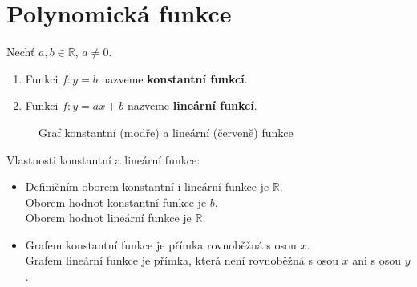 \section{Polynomická funkce}

\begin{definition}
Nechť $a, b \in \mathbb R$, $a \neq 0$.
\begin{enumerate}[$i.$]
  \item Funkci $f\colon y = b$ nazveme \textbf{konstantní funkcí}.
  \item Funkci $f\colon y= ax + b$ nazveme \textbf{lineární funkcí}.
\end{enumerate}
\end{definition}

\begin{figure}[ht!]
\begin{center}
  \caption{Graf konstantní (modře) a lineární (červeně) funkce}
\end{center}
\end{figure}

\begin{pozn}
Vlastnosti konstantní a lineární funkce:
  \begin{itemize}
    \item Definičním oborem konstantní i lineární funkce je $\mathbb R$. \\
          Oborem hodnot konstantní funkce je ${b}$.\\
          Oborem hodnot lineární funkce je $\mathbb R$.
    \item Grafem konstantní funkce je přímka rovnoběžná s osou $x$. \\
          Grafem lineární funkce je přímka, která není rovnoběžná s osou $x$ ani s osou $y$.
  \end{itemize}
\end{pozn}

